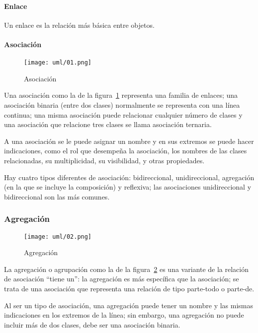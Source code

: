 \paragraph*{Enlace}
Un enlace es la relación más básica entre objetos.

\paragraph*{Asociación}



\begin{figure}[H] 
    \centering
    \texttt{[image: uml/01.png]}
    \caption{Asociación}
    \label{img:uml-asociacion}
\end{figure}

Una asociación como la de la figura~\ref{img:uml-asociacion} representa una familia de enlaces; una asociación binaria (entre dos clases) normalmente se representa con una línea continua; una misma asociación puede relacionar cualquier número de clases y una asociación que relacione tres clases se llama asociación ternaria.

A una asociación se le puede asignar un nombre y en sus extremos se puede hacer indicaciones, como el rol que desempeña la asociación, los nombres de las clases relacionadas, su multiplicidad, su visibilidad, y otras propiedades.

Hay cuatro tipos diferentes de asociación: bidireccional, unidireccional, agregación (en la que se incluye la composición) y reflexiva; las asociaciones unidireccional y bidireccional son las más comunes.


\subsubsection*{Agregación}


\begin{figure}[H] 
    \centering
    \texttt{[image: uml/02.png]}
    \caption{Agregación}
    \label{img:uml-agregacion}
\end{figure}


La agregación o agrupación como la de la figura~\ref{img:uml-agregacion} es una variante de la relación de asociación ``tiene un'': la agregación es más específica que la asociación; se trata de una asociación que representa una relación de tipo parte-todo o parte-de.


Al ser un tipo de asociación, una agregación puede tener un nombre y las mismas indicaciones en los extremos de la línea; sin embargo, una agregación no puede incluir más de dos clases, debe ser una asociación binaria.


